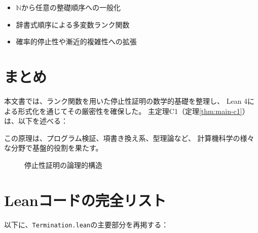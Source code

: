 \documentclass[11pt,a4paper]{ltjsarticle}
\theoremstyle{definition}
\begin{document}
\begin{itemize}[leftmargin=*]
\item $\mathbb{N}$から任意の整礎順序への一般化
\item 辞書式順序による多変数ランク関数
\item 確率的停止性や漸近的複雑性への拡張
\end{itemize}

\section{まとめ}

本文書では、ランク関数を用いた停止性証明の数学的基礎を整理し、
Lean 4による形式化を通じてその厳密性を確保した。
主定理C1（定理\ref{thm:main-c1}）は、以下を述べる：

\begin{center}
\end{center}

この原理は、プログラム検証、項書き換え系、型理論など、
計算機科学の様々な分野で基盤的役割を果たす。

\vspace{1em}

\begin{figure}[htbp]
\centering
{}
\caption{停止性証明の論理的構造}
\label{fig:logical-structure}
\end{figure}

\appendix

\section{Leanコードの完全リスト}

以下に、\texttt{Termination.lean}の主要部分を再掲する：
\end{document}
